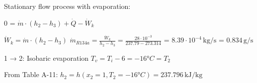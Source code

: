 Stationary flow process with evaporation:  

0 = \( \dot{m} \cdot (h_2 - h_3) + \dot{Q} - \dot{W}_k \)  

\( \dot{W}_k = \dot{m} \cdot (h_2 - h_3) \)  
\( \dot{m}_{R134a} = \frac{\dot{W}_k}{h_2 - h_3} = \frac{28 \cdot 10^{-3}}{237.79 - 273.314} \)  
= \( 8.39 \cdot 10^{-4} \, \text{kg/s} \)  
= \( 0.834 \, \text{g/s} \)  

1 → 2: Isobaric evaporation  
\( T_v = T_i - 6 = -16°C = T_2 \)  

From Table A-11:  
\( h_2 = h(x_2 = 1, T_2 = -16°C) = 237.796 \, \text{kJ/kg} \)